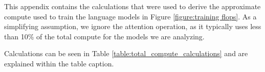


This appendix contains the calculations that were used to derive the approximate compute used to train the language models in Figure \ref{figure:training flops}. As a simplifying assumption, we ignore the attention operation, as it typically uses less than 10\% of the total compute for the models we are analyzing.

Calculations can be seen in Table \ref{table:total_compute_calculations} and are explained within the table caption.

